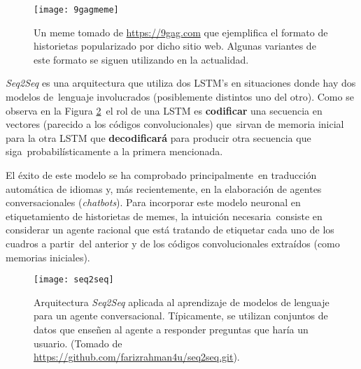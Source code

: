 \begin{figure}
  \centering
  \texttt{[image: 9gagmeme]}
  \caption{
    Un meme tomado de \url{https://9gag.com} que ejemplifica el formato de historietas popularizado
    por dicho sitio web. Algunas variantes de este formato se siguen utilizando en la actualidad.
  }
  \label{9gagmeme}
\end{figure}

\emph{Seq2Seq} es una arquitectura que utiliza dos LSTM's en situaciones donde hay dos modelos de\
lenguaje involucrados (posiblemente distintos uno del otro). Como se observa en la Figura \ref{seq2seq}\
el rol de una LSTM es \textbf{codificar} una secuencia en vectores (parecido a los códigos convolucionales) que\
sirvan de memoria inicial para la otra LSTM que \textbf{decodificará} para producir otra secuencia que siga\
probabilísticamente a la primera mencionada.\par
El éxito de este modelo se ha comprobado principalmente\
en traducción automática de idiomas y, más recientemente, en la elaboración de agentes conversacionales (\emph{chatbots}).
Para incorporar este modelo neuronal en etiquetamiento de historietas de memes, la intuición necesaria\
consiste en considerar un agente racional que está tratando de etiquetar cada uno de los cuadros a partir\
del anterior y de los códigos convolucionales extraídos (como memorias iniciales).

\begin{figure}
  \centering
  \texttt{[image: seq2seq]}
  \caption{
    Arquitectura \emph{Seq2Seq} aplicada al aprendizaje de modelos de lenguaje para un agente conversacional.
    Típicamente, se utilizan conjuntos de datos que enseñen al agente a responder preguntas que haría un
    usuario. (Tomado de \url{https://github.com/farizrahman4u/seq2seq.git}).
  }
  \label{seq2seq}
\end{figure}

